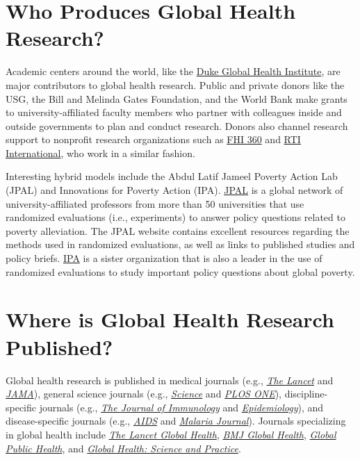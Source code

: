 \documentclass[justified,twoside,symmetric,]{tufte-book}
\begin{document}
\hypertarget{who-produces-global-health-research}{%
\section{Who Produces Global Health Research?}\label{who-produces-global-health-research}}

Academic centers around the world, like the \href{https://globalhealth.duke.edu/}{Duke Global Health Institute}, are major contributors to global health research. Public and private donors like the USG, the Bill and Melinda Gates Foundation, and the World Bank make grants to university-affiliated faculty members who partner with colleagues inside and outside governments to plan and conduct research. Donors also channel research support to nonprofit research organizations such as \href{https://www.fhi360.org/}{FHI 360} and \href{https://www.rti.org/}{RTI International}, who work in a similar fashion.

Interesting hybrid models include the Abdul Latif Jameel Poverty Action Lab (JPAL) and Innovations for Poverty Action (IPA). \href{http://www.povertyactionlab.org/}{JPAL} is a global network of university-affiliated professors from more than 50 universities that use randomized evaluations (i.e., experiments) to answer policy questions related to poverty alleviation. The JPAL website contains excellent resources regarding the methods used in randomized evaluations, as well as links to published studies and policy briefs. \href{http://www.poverty-action.org/}{IPA} is a sister organization that is also a leader in the use of randomized evaluations to study important policy questions about global poverty.

\hypertarget{where-is-global-health-research-published}{%
\section{Where is Global Health Research Published?}\label{where-is-global-health-research-published}}

Global health research is published in medical journals (e.g., \href{http://www.thelancet.com/}{\emph{The Lancet}} and \href{http://jamanetwork.com/journals/jama}{\emph{JAMA}}), general science journals (e.g., \href{http://science.sciencemag.org/}{\emph{Science}} and \href{http://journals.plos.org/plosone/}{\emph{PLOS ONE}}), discipline-specific journals (e.g., \href{http://www.jimmunol.org/content/198/1/184.short}{\emph{The Journal of Immunology}} and \href{http://journals.lww.com/epidem/pages/default.aspx}{\emph{Epidemiology}}), and disease-specific journals (e.g., \href{http://journals.lww.com/aidsonline/Pages/default.aspx}{\emph{AIDS}} and \href{https://malariajournal.biomedcentral.com/}{\emph{Malaria Journal}}). Journals specializing in global health include \href{http://www.thelancet.com/journals/langlo/latestcontent}{\emph{The Lancet Global Health}}, \href{http://gh.bmj.com/}{\emph{BMJ Global Health}}, \href{http://www.tandfonline.com/toc/rgph20/current}{\emph{Global Public Health}}, and \href{http://www.ghspjournal.org/}{\emph{Global Health: Science and Practice}}.
\end{document}
